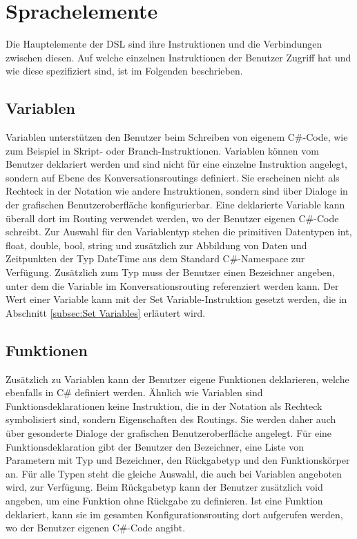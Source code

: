 \section{Sprachelemente}
\label{sec:Sprachelemente}
Die Hauptelemente der DSL sind ihre Instruktionen und die Verbindungen zwischen diesen. Auf welche einzelnen Instruktionen der Benutzer Zugriff hat und wie diese spezifiziert sind, ist im Folgenden beschrieben. 

\subsection{Variablen}
\label{subsec:Variablen}
Variablen unterstützen den Benutzer beim Schreiben von eigenem C\#-Code, wie zum Beispiel in Skript- oder Branch-Instruktionen. Variablen können vom Benutzer deklariert werden und sind nicht für eine einzelne Instruktion angelegt, sondern auf Ebene des Konversationsroutings definiert. Sie erscheinen nicht als Rechteck in der Notation wie andere Instruktionen, sondern sind über Dialoge in der grafischen Benutzeroberfläche konfigurierbar. Eine deklarierte Variable kann überall dort im Routing verwendet werden, wo der Benutzer eigenen C\#-Code schreibt. Zur Auswahl für den Variablentyp stehen die primitiven Datentypen int, float, double, bool, string und zusätzlich zur Abbildung von Daten und Zeitpunkten der Typ DateTime aus dem Standard C\#-Namespace zur Verfügung. Zusätzlich zum Typ muss der Benutzer einen Bezeichner angeben, unter dem die Variable im Konversationsrouting referenziert werden kann. Der Wert einer Variable kann mit der Set Variable-Instruktion gesetzt werden, die in Abschnitt \ref{subsec:Set Variables} erläutert wird. 

\subsection{Funktionen}
Zusätzlich zu Variablen kann der Benutzer eigene Funktionen deklarieren, welche ebenfalls in C\# definiert werden. Ähnlich wie Variablen sind Funktionsdeklarationen keine Instruktion, die in der Notation als Rechteck symbolisiert sind, sondern Eigenschaften des Routings. Sie werden daher auch über gesonderte Dialoge der grafischen Benutzeroberfläche angelegt. Für eine Funktionsdeklaration gibt der Benutzer den Bezeichner, eine Liste von Parametern mit Typ und Bezeichner, den Rückgabetyp und den Funktionskörper an. Für alle Typen steht die gleiche Auswahl, die auch bei Variablen angeboten wird, zur Verfügung. Beim Rückgabetyp kann der Benutzer zusätzlich void angeben, um eine Funktion ohne Rückgabe zu definieren. Ist eine Funktion deklariert, kann sie im gesamten Konfigurationsrouting dort aufgerufen werden, wo der Benutzer eigenen C\#-Code angibt.  

